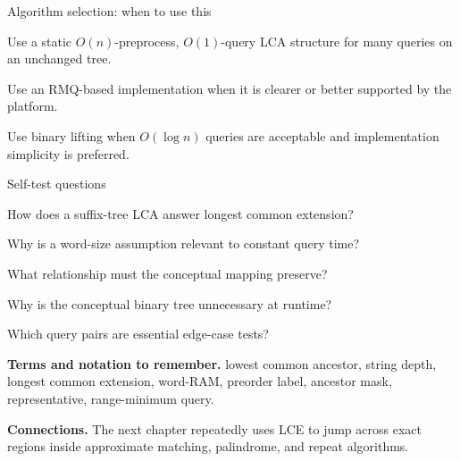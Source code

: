 \documentclass[11pt,letterpaper]{article}
\begin{document}
\begin{CornellOverviewBox}{Algorithm selection: when to use this}
\begin{CornellChecklist}
  \item Use a static $O(n)$-preprocess, $O(1)$-query LCA structure for many queries on an unchanged tree.
  \item Use an RMQ-based implementation when it is clearer or better supported by the platform.
  \item Use binary lifting when $O(\log n)$ queries are acceptable and implementation simplicity is preferred.
\end{CornellChecklist}
\end{CornellOverviewBox}

\begin{CornellExamBox}{Self-test questions}
\begin{CornellRecallList}
  \item How does a suffix-tree LCA answer longest common extension?
  \item Why is a word-size assumption relevant to constant query time?
  \item What relationship must the conceptual mapping preserve?
  \item Why is the conceptual binary tree unnecessary at runtime?
  \item Which query pairs are essential edge-case tests?
\end{CornellRecallList}
\end{CornellExamBox}

{\footnotesize
\textbf{Terms and notation to remember.} lowest common ancestor, string depth, longest common extension, word-RAM, preorder label, ancestor mask, representative, range-minimum query.

\textbf{Connections.} The next chapter repeatedly uses LCE to jump across exact regions inside approximate matching, palindrome, and repeat algorithms.
}
\end{document}
